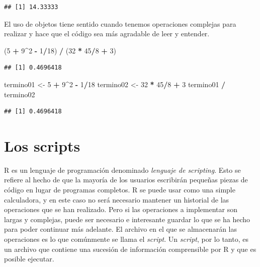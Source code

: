\documentclass[]{book}
\newenvironment{Shaded}{\begin{snugshade}}{\end{snugshade}}
\newcommand{\DecValTok}[1]{\textcolor[rgb]{0.00,0.00,0.81}{#1}}
\newcommand{\StringTok}[1]{\textcolor[rgb]{0.31,0.60,0.02}{#1}}
\newcommand{\OperatorTok}[1]{\textcolor[rgb]{0.81,0.36,0.00}{\textbf{#1}}}
\newcommand{\NormalTok}[1]{#1}
\begin{document}
\begin{verbatim}
## [1] 14.33333
\end{verbatim}

El uso de objetos tiene sentido cuando tenemos operaciones complejas
para realizar y hace que el código sea más agradable de leer y entender.

\begin{Shaded}
\begin{Highlighting}[]
\NormalTok{(}\DecValTok{5} \OperatorTok{+}\StringTok{ }\DecValTok{9}\OperatorTok{^}\DecValTok{2} \OperatorTok{-}\StringTok{ }\DecValTok{1}\OperatorTok{/}\DecValTok{18}\NormalTok{) }\OperatorTok{/}\StringTok{ }\NormalTok{(}\DecValTok{32} \OperatorTok{*}\StringTok{ }\DecValTok{45}\OperatorTok{/}\DecValTok{8} \OperatorTok{+}\StringTok{ }\DecValTok{3}\NormalTok{)}
\end{Highlighting}
\end{Shaded}

\begin{verbatim}
## [1] 0.4696418
\end{verbatim}

\begin{Shaded}
\begin{Highlighting}[]
\NormalTok{termino01 <-}\StringTok{ }\DecValTok{5} \OperatorTok{+}\StringTok{ }\DecValTok{9}\OperatorTok{^}\DecValTok{2} \OperatorTok{-}\StringTok{ }\DecValTok{1}\OperatorTok{/}\DecValTok{18}
\NormalTok{termino02 <-}\StringTok{ }\DecValTok{32} \OperatorTok{*}\StringTok{ }\DecValTok{45}\OperatorTok{/}\DecValTok{8} \OperatorTok{+}\StringTok{ }\DecValTok{3}
\NormalTok{termino01 }\OperatorTok{/}\StringTok{ }\NormalTok{termino02}
\end{Highlighting}
\end{Shaded}

\begin{verbatim}
## [1] 0.4696418
\end{verbatim}

\section{Los scripts}\label{los-scripts}

R es un lenguaje de programación denominado \emph{lenguaje de
scripting}. Esto se refiere al hecho de que la mayoría de los usuarios
escribirán pequeñas piezas de código en lugar de programas completos. R
se puede usar como una simple calculadora, y en este caso no será
necesario mantener un historial de las operaciones que se han realizado.
Pero si las operaciones a implementar son largas y complejas, puede ser
necesario e interesante guardar lo que se ha hecho para poder continuar
más adelante. El archivo en el que se almacenarán las operaciones es lo
que comúnmente se llama el \emph{script}. Un \emph{script}, por lo
tanto, es un archivo que contiene una sucesión de información
comprensible por R y que es posible ejecutar.
\end{document}
